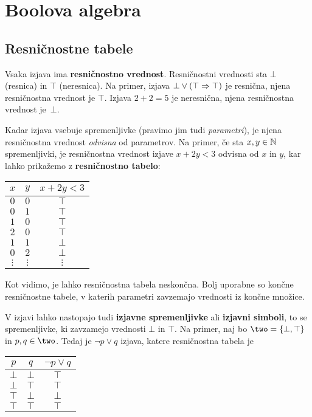 \chapter{Boolova algebra}

\section{Resničnostne tabele}

Vsaka izjava ima \textbf{resničnostno vrednost}. Resničnostni vrednosti sta $\bot$
(resnica) in $\top$ (neresnica). Na primer, izjava $\bot \lor (\top \Rightarrow \top)$ je resnična, njena resničnostna vrednost je $\top$. Izjava $2 + 2 = 5$ je neresnična, njena resničnostna vrednost je~$\bot$.

Kadar izjava vsebuje spremenljivke (pravimo jim tudi \emph{parametri}), je njena
resničnostna vrednost \emph{odvisna} od parametrov. Na primer, če sta $x, y \in \mathbb{N}$ spremenljivki, je resničnostna vrednost izjave $x + 2 y < 3$ odvisna
od $x$ in $y$, kar lahko prikažemo z \textbf{resničnostno tabelo}:
%
\begin{center}
  \begin{tabular}{ccc}
    \toprule
    $x$ & $y$ & $x + 2 y < 3$ \\ \midrule
    $0$ & $0$ & $\top$ \\
    $0$ & $1$ & $\top$ \\
    $1$ & $0$ & $\top$ \\
    $2$ & $0$ & $\top$ \\
    $1$ & $1$ & $\bot$ \\
    $0$ & $2$ & $\bot$ \\
    $\vdots$ & $\vdots$ & $\vdots$ \\
    \bottomrule
  \end{tabular}
\end{center}
% 
Kot vidimo, je lahko resničnostna tabela neskončna. Bolj uporabne so končne resničnostne tabele, v katerih parametri zavzemajo vrednosti iz končne množice.

V izjavi lahko nastopajo tudi \textbf{izjavne spremenljivke} ali \textbf{izjavni simboli}, to se spremenljivke, ki zavzamejo vrednosti $\bot$ in $\top$.
Na primer, naj bo $\two = \set{\bot, \top}$ in $p, q \in \two$. Tedaj je $\neg p \lor q$ izjava, katere resničnostna tabela je
%
\begin{center}
  \begin{tabular}{ccc}
    \toprule
    $p$ & $q$ & $\neg p \lor q$ \\ \midrule
    $\bot$ & $\bot$ & $\top$ \\
    $\bot$ & $\top$ & $\top$ \\
    $\top$ & $\bot$ & $\bot$ \\
    $\top$ & $\top$ & $\top$ \\
    \bottomrule
  \end{tabular}
\end{center}


